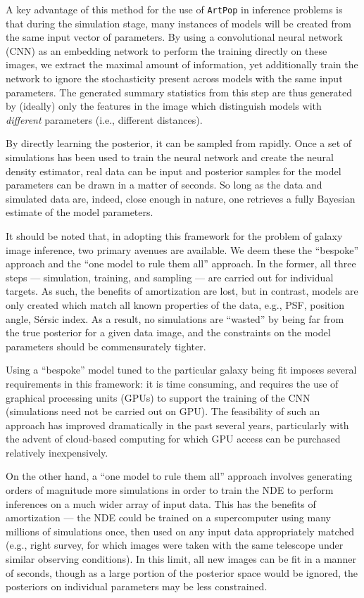 \documentclass[twocolumn]{aastex631}
\newcommand{\artpop}[0]{\texttt{ArtPop}}
\begin{document}
A key advantage of this method for the use of \artpop{} in inference problems is that during the simulation stage, many instances of models will be created from the same input vector of parameters. By using a convolutional neural network (CNN) as an embedding network to perform the training directly on these images, we extract the maximal amount of information, yet additionally train the network to ignore the stochasticity present across models with the same input parameters. The generated summary statistics from this step are thus generated by (ideally) only the features in the image which distinguish models with \textit{different} parameters (i.e., different distances). 

By directly learning the posterior, it can be sampled from rapidly. Once a set of simulations has been used to train the neural network and create the neural density estimator, real data can be input and posterior samples for the model parameters can be drawn in a matter of seconds. So long as the data and simulated data are, indeed, close enough in nature, one retrieves a fully Bayesian estimate of the model parameters. 

It should be noted that, in adopting this framework for the problem of galaxy image inference, two primary avenues are available. We deem these the ``bespoke'' approach and the ``one model to rule them all'' approach. In the former, all three steps --- simulation, training, and sampling --- are carried out for individual targets. As such, the benefits of amortization are lost, but in contrast, models are only created which match all known properties of the data, e.g., PSF, position angle, Sérsic index. As a result, no simulations are ``wasted'' by being far from the true posterior for a given data image, and the constraints on the model parameters should be commensurately tighter. 

Using a ``bespoke'' model tuned to the particular galaxy being fit imposes several requirements in this framework: it is time consuming, and requires the use of graphical processing units (GPUs) to support the training of the CNN (simulations need not be carried out on GPU). The feasibility of such an approach has improved dramatically in the past several years, particularly with the advent of cloud-based computing for which GPU access can be purchased relatively inexpensively.

On the other hand, a ``one model to rule them all'' approach involves generating orders of magnitude more simulations in order to train the NDE to perform inferences on a much wider array of input data. This has the benefits of amortization --- the NDE could be trained on a supercomputer using many millions of simulations once, then used on any input data appropriately matched (e.g., right survey, for which images were taken with the same telescope under similar observing conditions). In this limit, all new images can be fit in a manner of seconds, though as a large portion of the posterior space would be ignored, the posteriors on individual parameters may be less constrained. 
\end{document}
